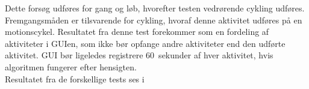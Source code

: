 Dette forsøg udføres for gang og løb, hvorefter testen vedrørende cykling udføres. Fremgangsmåden er tilsvarende for cykling, hvoraf denne aktivitet udføres på en motionscykel. Resultatet fra denne test forekommer som en fordeling af aktiviteter i GUIen, som ikke bør opfange andre aktiviteter end den udførte aktivitet. GUI bør ligeledes registrere 60~sekunder af hver aktivitet, hvis algoritmen fungerer efter hensigten. \\
Resultatet fra de forskellige tests ses i 
\begin{table}[H]
	\centering
\end{table}
